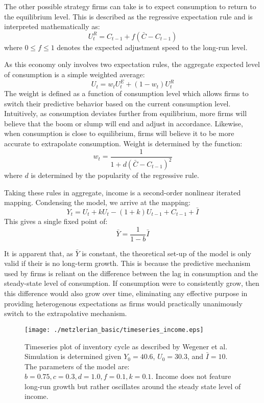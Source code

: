 The other possible strategy firms can take is to expect consumption to return to the equilibrium level. This is described as the regressive expectation rule and is interpreted mathematically as:
\begin{equation}
    U_t^R=C_{t-1}+f(\bar C-C_{t-1})
\end{equation}
where $0\leq f\leq 1$ denotes the expected adjustment speed to the long-run level. 

As this economy only involves two expectation rules, the aggregate expected level of consumption is a simple weighted average:
\begin{equation}
    U_t=w_tU_t^E+(1-w_t)U_t^R
\end{equation}
The weight is defined as a function of consumption level which allows firms to switch their predictive behavior based on the current consumption level. Intuitively, as consumption deviates further from equilibrium, more firms will believe that the boom or slump will end and adjust in accordance. Likewise, when consumption is close to equilibrium, firms will believe it to be more accurate to extrapolate consumption. Weight is determined by the function:
\begin{equation}
    w_t=\frac{1}{1+d(\bar C-C_{t-1})^2}
\end{equation}
where $d$ is determined by the popularity of the regressive rule. 

Taking these rules in aggregate, income is a second-order nonlinear iterated mapping. Condensing the model, we arrive at the mapping:
\begin{equation}
    Y_t=U_t+kU_t-(1+k)U_{t-1}+C_{t-1}+\bar I
\end{equation}
This gives a single fixed point of:
\begin{equation}
    \bar Y=\frac{1}{1-b}\bar I
\end{equation}

It is apparent that, as $\bar Y$ is constant, the theoretical set-up of the model is only valid if their is no long-term growth. This is because the predictive mechanism used by firms is reliant on the difference between the lag in consumption and the steady-state level of consumption. If consumption were to consistently grow, then this difference would also grow over time, eliminating any effective purpose in providing heterogenous expectations as firms would practically unanimously switch to the extrapolative mechanism. 


\begin{figure}
    \centering
    \texttt{[image: ./metzlerian\_basic/timeseries\_income.eps]}
    \caption{Timeseries plot of inventory cycle as described by Wegener et al.\autocite{Wegener2009} Simulation is determined given $Y_0=40.6$, $U_0=30.3$, and $\bar I=10$. The parameters of the model are: $b=0.75,c=0.3,d=1.0,f=0.1,k=0.1$. Income does not feature long-run growth but rather oscillates around the steady state level of income.}
    \label{metzler_basic_timeseries}
\end{figure}

